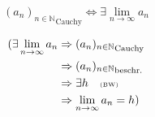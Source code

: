 $${(a_n)_{n \in \mathbb{N}}}_\text{Cauchy} \Leftrightarrow \exists \lim_{n \rightarrow \infty} a_n$$

\begin{align*}
  (\exists \lim_{n \rightarrow \infty} a_n
   & \Rightarrow {(a_n)_{n \in \mathbb{N}}}_\text{Cauchy}  \\
   & \Rightarrow {(a_n)_{n \in \mathbb{N}}}_\text{beschr.} \\
   & \Rightarrow \exists h \quad \text{\tiny (BW)}         \\
   & \Rightarrow \lim_{n \rightarrow \infty} a_n = h)
\end{align*}
